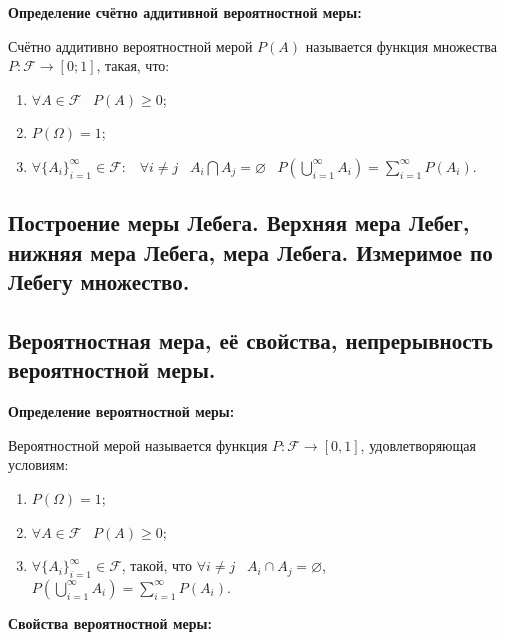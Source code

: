 \textbf{Определение счётно аддитивной 
вероятностной меры:}
    \smallskip

    Счётно аддитивно вероятностной мерой $P(A)$
    называется функция множества $P: \mathcal{F}
    \rightarrow [0; 1]$, такая, что:

    \begin{enumerate}
        \item{$\forall A \in \mathcal{F} \;\;\;
        P(A) \geq 0$;}
        \item{$P(\Omega) = 1$;}
        \item{$\forall \{A_i\}_{i = 1}^{\infty}
        \in \mathcal{F} : \;\;\; \forall
        i \neq j \;\;\; A_i \bigcap A_j = 
        \varnothing \;\;\; P\left(\bigcup\limits_{i = 1}^{
        \infty} A_i\right) = \sum_{i = 1}^{\infty}
        P(A_i)$.}
    \end{enumerate}
    \bigskip  

\subsection{Построение меры Лебега. Верхняя мера Лебег, нижняя мера Лебега, мера
Лебега. Измеримое по Лебегу множество.}    

\subsection{Вероятностная мера, её свойства, непрерывность вероятностной меры.}

\textbf{Определение вероятностной меры:}
    \smallskip

    Вероятностной мерой называется функция $P : \mathcal{F} \to [0, 1]$,
    удовлетворяющая условиям:

    \begin{enumerate}
        \item{$P(\Omega) = 1$;}
        \item{$\forall A \in \mathcal{F} \;\;\; P(A) \geq 0$;}
        \item{$\forall \{A_i\}^{\infty}_{i = 1} \in \mathcal{F}$,
        такой, что $\forall i \neq j \;\;\; A_i \cap A_j = \varnothing$,
        $P\left(\bigcup\limits^{\infty}_{i = 1}A_i\right) = \sum\limits^{\infty}_{i = 1} P(A_i)$.}
    \end{enumerate}
    \bigskip

\textbf{Свойства вероятностной меры:}    
    \smallskip

